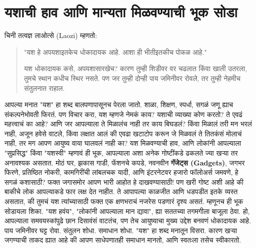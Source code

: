  \chapter{यशाची हाव आणि मान्यता मिळवण्याची भूक सोडा}
चिनी तत्वज्ञ लाओत्से (Laozi) म्हणतो:
 \begin{quote}
 "यश हे अपयशाइतकेच धोकादायक आहे.
 आशा ही भीतीइतकीच पोकळ आहे."

 यश धोकादायक कसे, अपयशासारखेच?
 कारण तुम्ही शिडीवर वर चढलात किंवा खाली उतरला,
 तुमचे स्थान कधीच स्थिर नसते.
पण जर तुम्ही दोन्ही पाय जमिनीवर रोवले,
तर तुम्ही नेहमीच संतुलनात राहाल.
 \end{quote}
आपल्या मनात "यश" हा शब्द बालपणापासूनच पेरला जातो. शाळा, शिक्षण, स्पर्धा, सगळं जणू ह्याच संकल्पनेभोवती फिरतं. पण विचार करा, यश म्हणजे नेमकं काय?  यशाची व्याख्या कोण करतो?  ते एवढं महत्त्वाचं का आहे?  आणि जर आपल्याला ते मिळालंच नाही तर काय बिघडलं?  किंवा मिळालं तरी मन भरलं नाही, अजून हवेसे वाटले,  किंवा लक्षात आलं की एवढा खटाटोप करून जे मिळवलं ते तितकंसं मोलाचं नाही,  तर मग आपण आयुष्य वाया घालवलं नाही का?
यश मिळवण्याची हाव, आणि लोकांनी आपल्याला "सुप्रसिद्ध" किंवा "यशस्वी" म्हणावं ही भूक, आपल्याला अशा अनेक गोष्टींकडे ढकलते ज्या खऱ्या तर अनावश्यक असतात.  मोठं घर, झकास गाडी, फॅशनचे कपडे, नवनवीन \textbf{गॅजेट्स (Gadgets)}, जगभर फिरणे, प्रतिष्ठित नोकरी, कामगिरींची लांबलचक यादी, आणि इंटरनेटवर हजारो फॉलोअर्स जमवणे,  हे सगळं कशासाठी? फक्त जगासमोर आपण भारी आहोत हे दाखवण्यासाठी! पण खरी गोष्ट अशी आहे की बाकीचे लोक आपल्याकडे फार लक्ष देत नाहीत. ते आपापल्या काळजीत आणि धडपडीत इतके व्यस्त असतात, की तुमचं यश त्यांच्यासाठी फक्त एक क्षणभराचं नजरेस पडणारं दृश्य असतं.
म्हणूनच ही भूक सोडायला शिका. "यश हवंय", "लोकांनी आपल्याला मान द्यावा",  ह्या सततच्या तगमगीला बाजूला ठेवा. हो, आपल्याला समवयस्कांपुढे छान दिसावंसं वाटतंच, पण तेच आयुष्याचा मुख्य उद्देश बनवणं धोकादायक आहे. पाय जमिनीवर घट्ट रोवा.  संतुलन शोधा. समाधान शोधा.  "यश" हा शब्द मनातून विसरा.  कारण खऱ्या जगण्याची ताकद ह्यात आहे की  आपण साधेपणातही समाधान मानतो, आणि स्वतःला तसेच स्वीकारतो.

